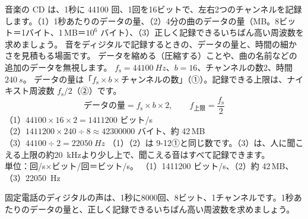\begin{kotoba}
\small
{}
\end{kotoba}

{}

\label{ph:波-11:ex1}
\begin{phreidai}
音楽の CD は、1秒に \num{44100} 回、1回を16ビットで、左右2つのチャンネルを記録します。（1）1秒あたりのデータの量、（2）4分の曲のデータの量（MB。8ビット＝1バイト、1\,MB＝$10^6$ バイト）、（3）正しく記録できるいちばん高い周波数を求めましょう。
\phbamen
音をディジタルで記録するときの、データの量と、時間の細かさを見積もる場面です。
\phmushi
データを縮める（圧縮する）ことや、曲の名前などの追加のデータを無視します。
\phzu
$f_{\mathrm s}=\qty{44100}{Hz}$、$b=16$、チャンネルの数2、時間 $\qty{240}{s}$。
\phriyu
データの量は「$f_{\mathrm s}\times b\times$チャンネルの数」（①）。記録できる上限は、ナイキスト周波数 $f_{\mathrm s}/2$（②）です。
\phtateru
\[\text{データの量}=f_{\mathrm s}\times b\times2,\qquad f_{\text{上限}}=\frac{f_{\mathrm s}}{2}\]
\phtoku
（1）$\num{44100}\times16\times2=\num{1411200}$ ビット/s\\
（2）$\num{1411200}\times240\div8\approx\num{42300000}$ バイト、約 42\,MB\\
（3）$\num{44100}\div2=\qty{22050}{Hz}$
\phtashikame
（1）（2）は 9-12①と同じ数です。（3）は、人に聞こえる上限の約\qty{20}{kHz}より少し上で、聞こえる音はすべて記録できます。\\
単位：回/s×ビット/回＝ビット/s。
\kotae （1）\num{1411200} ビット/s、（2）約 42\,MB、（3）\qty{22050}{Hz}
\end{phreidai}
\begin{jibun}
固定電話のディジタルの声は、1秒に8000回、8ビット、1チャンネルです。1秒あたりのデータの量と、正しく記録できるいちばん高い周波数を求めましょう。
\end{jibun}

